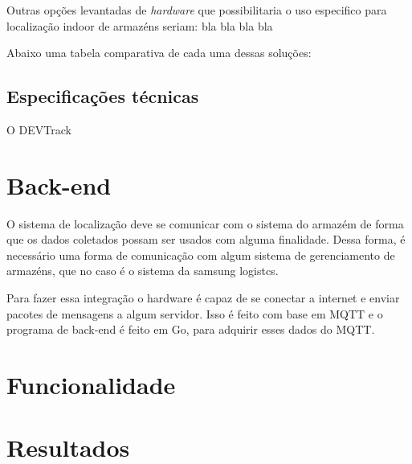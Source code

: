 Outras opções levantadas de \textit{hardware} que possibilitaria o uso especifico para localização indoor de armazéns seriam:
bla bla bla bla


Abaixo uma tabela comparativa de cada uma dessas soluções: 


\subsection{Especificações técnicas}
O DEVTrack


\section{Back-end}
O sistema de localização deve se comunicar com o sistema do armazém de forma que os dados coletados possam ser usados com alguma finalidade. Dessa forma, é necessário uma forma de comunicação com algum sistema de gerenciamento de armazéns, que no caso é o sistema da samsung logistcs.

Para fazer essa integração o hardware é capaz de se conectar a internet e enviar pacotes de mensagens a algum servidor. Isso é feito com base em MQTT e o programa de back-end é feito em Go, para adquirir esses dados do MQTT.




\section{Funcionalidade}
\section{Resultados}
